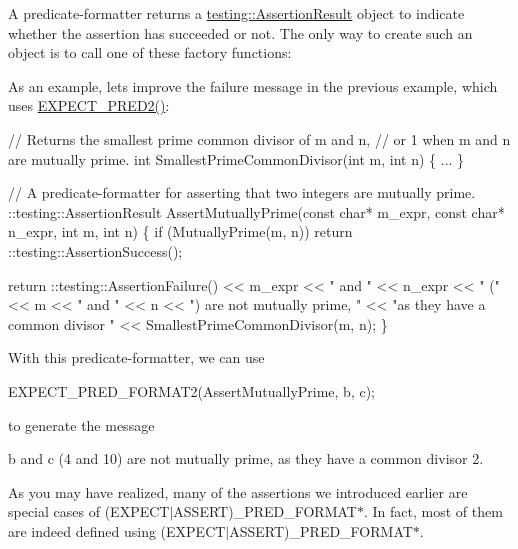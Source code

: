 A predicate-\/formatter returns a {\ttfamily \hyperlink{classtesting_1_1_assertion_result}{testing\+::\+Assertion\+Result}} object to indicate whether the assertion has succeeded or not. The only way to create such an object is to call one of these factory functions\+:

As an example, let\textquotesingle{}s improve the failure message in the previous example, which uses {\ttfamily \hyperlink{gtest__pred__impl_8h_a14e74e655e502914d3d07e083145ac91}{E\+X\+P\+E\+C\+T\+\_\+\+P\+R\+E\+D2()}}\+:


\begin{DoxyCode}
// Returns the smallest prime common divisor of m and n,
// or 1 when m and n are mutually prime.
int SmallestPrimeCommonDivisor(int m, int n) \{ ... \}

// A predicate-formatter for asserting that two integers are mutually prime.
::testing::AssertionResult AssertMutuallyPrime(const char* m\_expr,
                                               const char* n\_expr,
                                               int m,
                                               int n) \{
  if (MutuallyPrime(m, n))
    return ::testing::AssertionSuccess();

  return ::testing::AssertionFailure()
      << m\_expr << " and " << n\_expr << " (" << m << " and " << n
      << ") are not mutually prime, " << "as they have a common divisor "
      << SmallestPrimeCommonDivisor(m, n);
\}
\end{DoxyCode}


With this predicate-\/formatter, we can use


\begin{DoxyCode}
EXPECT\_PRED\_FORMAT2(AssertMutuallyPrime, b, c);
\end{DoxyCode}


to generate the message


\begin{DoxyPre}
b and c (4 and 10) are not mutually prime, as they have a common divisor 2.~\newline

\end{DoxyPre}


As you may have realized, many of the assertions we introduced earlier are special cases of {\ttfamily (E\+X\+P\+E\+C\+T$\vert$\+A\+S\+S\+E\+RT)\+\_\+\+P\+R\+E\+D\+\_\+\+F\+O\+R\+M\+A\+T$\ast$}. In fact, most of them are indeed defined using {\ttfamily (E\+X\+P\+E\+C\+T$\vert$\+A\+S\+S\+E\+RT)\+\_\+\+P\+R\+E\+D\+\_\+\+F\+O\+R\+M\+A\+T$\ast$}.

